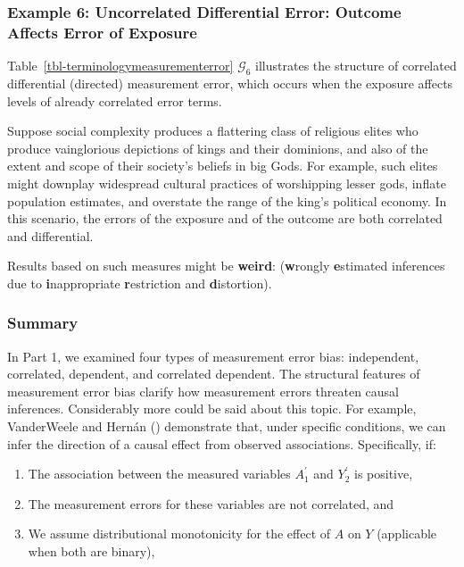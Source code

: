 \documentclass[
  single column]{article}
\providecommand{\tightlist}{%
  \setlength{\itemsep}{0pt}\setlength{\parskip}{0pt}}\usepackage{longtable,booktabs,array}
\begin{document}
\subsubsection{Example 6: Uncorrelated Differential Error: Outcome
Affects Error of
Exposure}\label{example-6-uncorrelated-differential-error-outcome-affects-error-of-exposure}

Table~\ref{tbl-terminologymeasurementerror} \(\mathcal{G}_6\)
illustrates the structure of correlated differential (directed)
measurement error, which occurs when the exposure affects levels of
already correlated error terms.

Suppose social complexity produces a flattering class of religious
elites who produce vainglorious depictions of kings and their dominions,
and also of the extent and scope of their society's beliefs in big Gods.
For example, such elites might downplay widespread cultural practices of
worshipping lesser gods, inflate population estimates, and overstate the
range of the king's political economy. In this scenario, the errors of
the exposure and of the outcome are both correlated and differential.

Results based on such measures might be \textbf{weird}:
(\textbf{w}rongly \textbf{e}stimated inferences due to
\textbf{i}nappropriate \textbf{r}estriction and \textbf{d}istortion).

\subsubsection{Summary}\label{summary}

In Part 1, we examined four types of measurement error bias:
independent, correlated, dependent, and correlated dependent. The
structural features of measurement error bias clarify how measurement
errors threaten causal inferences. Considerably more could be said about
this topic. For example, VanderWeele and Hernán
() demonstrate that, under specific
conditions, we can infer the direction of a causal effect from observed
associations. Specifically, if:

\begin{enumerate}
\def\labelenumi{\arabic{enumi}.}
\tightlist
\item
  The association between the measured variables \(A^{\prime}_{1}\) and
  \(Y^{\prime}_{2}\) is positive,
\item
  The measurement errors for these variables are not correlated, and
\item
  We assume distributional monotonicity for the effect of \(A\) on \(Y\)
  (applicable when both are binary),
\end{enumerate}
\end{document}
